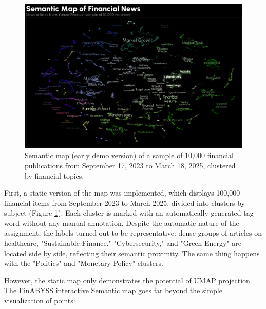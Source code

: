 \begin{figure}[H]
    \centering
    \includegraphics[width=1\linewidth]{img/semantic_map.png}
    \caption{Semantic map (early demo version) of a sample of 10,000 financial publications
    from September 17, 2023 to March 18, 2025, clustered by financial topics.}
    \label{fig:semantic_map}
\end{figure}

First, a static version of the map was implemented, which displays 100,000 financial items from September 2023
to March 2025, divided into clusters by subject (Figure \ref{fig:semantic_map}). Each cluster is marked
with an automatically generated tag word without any manual annotation. Despite the automatic nature
of the assignment, the labels turned out to be representative: dense groups of articles on healthcare,
"Sustainable Finance," "Cybersecurity," and "Green Energy" are located side by side, reflecting their semantic
proximity. The same thing happens with the "Politics" and "Monetary Policy" clusters.

However, the static map only demonstrates the potential of UMAP projection. The FinABYSS interactive Semantic
map goes far beyond the simple visualization of points:

